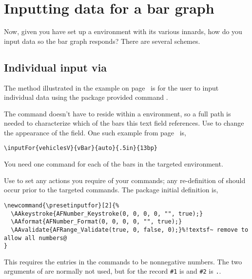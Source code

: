 \documentclass{article}
\edef\amtIndent{\the\parindent}
\begin{document}
\section{Inputting data for a bar graph}

Now, given you have set up a  environment with its various
innards, how do you input data so the bar graph responds? There are several schemes.

\subsection{Individual input via \texorpdfstring{\protect{}}{\textbackslash{inputFor}}}

The method illustrated in the example on page~\pageref{intro} is for the user to input individual data
using the package provided command .
\bVerb{}%
\def\1{\hskip\amtIndent\relax}%
\begin{dCmd}[commandchars=!(),fontsize=\small]{\bxSize}
\renewcommand\presetinputfor[2]{!ameta(eforms-actions)}
\end{dCmd}
\eVerb The command  doesn't have to reside within a
 environment, so a full path is needed to characterize which
of the bars this text field references. Use  to change the
appearance of the field. One such example from page~\pageref{intro} is,
\begin{Verbatim}[xleftmargin=\amtIndent,fontsize=\small,commandchars={!()}]
\inputFor{vehiclesV}{vBar}{auto}{.5in}{13bp}
\end{Verbatim}
You need one  command for each of the bars in the targeted  environment.

Use  to set any actions you require of your 
commands; any re-definition of  should occur prior to the
targeted  commands. The package initial definition is,
\begin{Verbatim}[xleftmargin=\amtIndent,fontsize=\small,commandchars={!~@}]
\newcommand{\presetinputfor}[2]{%
  \AAkeystroke{AFNumber_Keystroke(0, 0, 0, 0, "", true);}
  \AAformat{AFNumber_Format(0, 0, 0, 0, "", true);}
  \AAvalidate{AFRange_Validate(true, 0, false, 0);}%!textsf~ remove to allow all numbers@
}
\end{Verbatim}
This requires the entries in the  commands to be nonnegative
numbers. The two arguments of  are normally not used, but
for the record \texttt{\#1} is  and \texttt{\#2} is
\texttt{.}.
\end{document}
